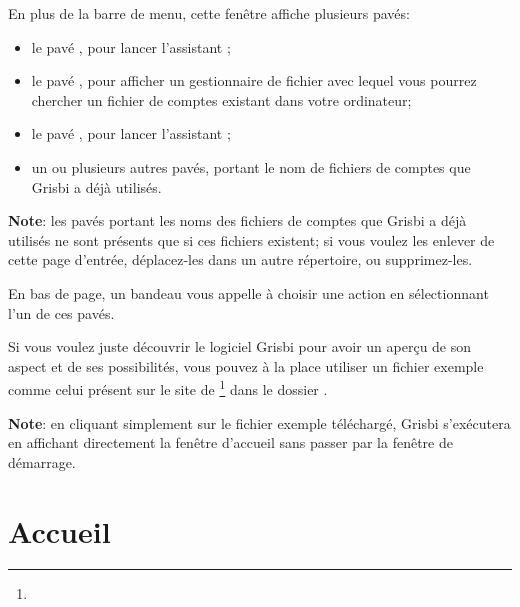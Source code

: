 
En plus de la barre de menu, cette fenêtre affiche plusieurs pavés:

\begin{itemize}
	\item le pavé , pour lancer l'assistant ;
	\item le pavé , pour afficher un gestionnaire de fichier avec lequel vous pourrez chercher un fichier de comptes existant dans votre ordinateur;
	\item le pavé , pour lancer l'assistant ;
	\item un ou plusieurs autres pavés, portant le nom de fichiers de comptes que Grisbi a déjà utilisés.
\end{itemize}


\textbf{Note}: les pavés portant les noms des fichiers de comptes que Grisbi a déjà utilisés ne sont présents que si ces fichiers existent; si vous voulez les enlever de cette page d'entrée, déplacez-les dans un autre répertoire, ou supprimez-les.


En bas de page, un bandeau vous appelle à choisir une action en sélectionnant l'un de ces pavés.


Si vous voulez juste découvrir le logiciel Grisbi pour avoir un aperçu de son aspect et de ses possibilités, vous pouvez à la place utiliser un fichier exemple comme celui présent sur le site de \footnote{\urlSourceForgeDocumentation{}} dans le dossier .		%


\textbf{Note}: en cliquant simplement sur le fichier exemple téléchargé, Grisbi s'exécutera en affichant directement la fenêtre d'accueil sans passer par la fenêtre de démarrage.


\section{Accueil\label{home}}


